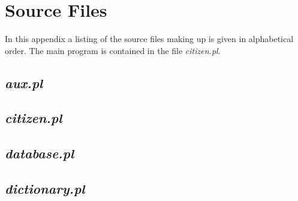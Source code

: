 
\chapter{Source Files}
\label{source}

In this appendix a listing of the source files making up {\nash} is
given in alphabetical order. The main program is contained in the file
{\em citizen.pl\/}.

\section*{\em aux.pl}

\begin{tgrind}
  
\end{tgrind}

\newpage

\section*{\em citizen.pl}

\begin{tgrind}
  
\end{tgrind}

\newpage

\section*{\em database.pl}

\begin{tgrind}
  
\end{tgrind}

\newpage

\section*{\em dictionary.pl}

\begin{tgrind}
  
\end{tgrind}

